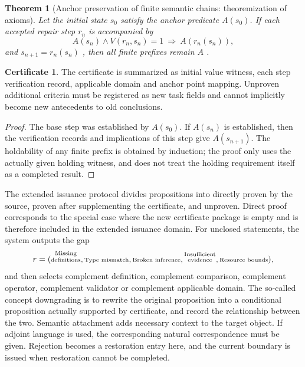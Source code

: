 \documentclass[11pt,a4paper]{article}
\theoremstyle{plain}
\newtheorem{theorem}{Theorem}[section]
\theoremstyle{definition}
\newtheorem*{certificate}{Certificate}
\theoremstyle{remark}
\begin{document}
\begin{CJK*}
\begin{theorem}
[Anchor preservation of finite semantic chains: theoremization of axioms]\label{ss:anchor}
Let the initial state $s_0$ satisfy the anchor predicate $A(s_0)$. If each accepted repair step $r_n$ is accompanied by \[
 A(s_n)\wedge V(r_n,s_n)=1\ \Longrightarrow\ A(r_n(s_n)),
\] and $s_{n+1}=r_n(s_n)$ , then all finite prefixes remain $A$ .\end{theorem}
\begin{certificate}
The certificate is summarized as initial value witness, each step verification record, applicable domain and anchor point mapping. Unproven additional criteria must be registered as new task fields and cannot implicitly become new antecedents to old conclusions.\end{certificate}
\begin{proof}
The base step was established by $A(s_0)$. If $A(s_n)$ is established, then the verification records and implications of this step give $A(s_{n+1})$. The holdability of any finite prefix is obtained by induction; the proof only uses the actually given holding witness, and does not treat the holding requirement itself as a completed result.\end{proof}


The extended issuance protocol divides propositions into directly proven by the source, proven after supplementing the certificate, and unproven. Direct proof corresponds to the special case where the new certificate package is empty and is therefore included in the extended issuance domain. For unclosed statements, the system outputs the gap \[
 r=(\text{\shortstack[c]{\scriptsize Missing\\[-1pt]\scriptsize definitions}},\text{\shortstack[c]{\scriptsize Type mismatch}},\text{\shortstack[c]{\scriptsize Broken inference}},
       \text{\shortstack[c]{\scriptsize Insufficient\\[-1pt]\scriptsize evidence}},\text{\shortstack[c]{\scriptsize Resource bounds}}),
\] and then selects complement definition, complement comparison, complement operator, complement validator or complement applicable domain. The so-called concept downgrading is to rewrite the original proposition into a conditional proposition actually supported by certificate, and record the relationship between the two. Semantic attachment adds necessary context to the target object. If adjoint language is used, the corresponding natural correspondence must be given. Rejection becomes a restoration entry here, and the current boundary is issued when restoration cannot be completed.


\end{CJK*}
\end{document}

